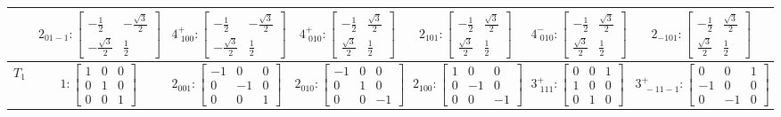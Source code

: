 \documentclass[fleqn,8pt,landscape]{jsarticle}
\begin{document}
\begin{longtable}{ccccccc}
& $ 2{}_{01-1}:\begin{bmatrix} - \frac{1}{2} & - \frac{\sqrt{3}}{2} \\ - \frac{\sqrt{3}}{2} & \frac{1}{2} \end{bmatrix} $ & $ 4^{+}_{\,\,100}:\begin{bmatrix} - \frac{1}{2} & - \frac{\sqrt{3}}{2} \\ - \frac{\sqrt{3}}{2} & \frac{1}{2} \end{bmatrix} $ & $ 4^{+}_{\,\,010}:\begin{bmatrix} - \frac{1}{2} & \frac{\sqrt{3}}{2} \\ \frac{\sqrt{3}}{2} & \frac{1}{2} \end{bmatrix} $ & $ 2{}_{101}:\begin{bmatrix} - \frac{1}{2} & \frac{\sqrt{3}}{2} \\ \frac{\sqrt{3}}{2} & \frac{1}{2} \end{bmatrix} $ & $ 4^{-}_{\,\,010}:\begin{bmatrix} - \frac{1}{2} & \frac{\sqrt{3}}{2} \\ \frac{\sqrt{3}}{2} & \frac{1}{2} \end{bmatrix} $ & $ 2{}_{-101}:\begin{bmatrix} - \frac{1}{2} & \frac{\sqrt{3}}{2} \\ \frac{\sqrt{3}}{2} & \frac{1}{2} \end{bmatrix} $ \\ \hline
$ T_{1} $ & $ 1:\begin{bmatrix} 1 & 0 & 0 \\ 0 & 1 & 0 \\ 0 & 0 & 1 \end{bmatrix} $ & $ 2{}_{001}:\begin{bmatrix} -1 & 0 & 0 \\ 0 & -1 & 0 \\ 0 & 0 & 1 \end{bmatrix} $ & $ 2{}_{010}:\begin{bmatrix} -1 & 0 & 0 \\ 0 & 1 & 0 \\ 0 & 0 & -1 \end{bmatrix} $ & $ 2{}_{100}:\begin{bmatrix} 1 & 0 & 0 \\ 0 & -1 & 0 \\ 0 & 0 & -1 \end{bmatrix} $ & $ 3^{+}_{\,\,111}:\begin{bmatrix} 0 & 0 & 1 \\ 1 & 0 & 0 \\ 0 & 1 & 0 \end{bmatrix} $ & $ 3^{+}_{\,\,-11-1}:\begin{bmatrix} 0 & 0 & 1 \\ -1 & 0 & 0 \\ 0 & -1 & 0 \end{bmatrix} $ \\

\end{longtable}
\end{document}
